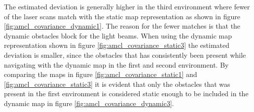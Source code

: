 The estimated deviation is generally higher in the third environment where fewer of the laser scans match with the static map representation as shown in figure \ref{fig:amcl_covariance_dynamic1}. 
The reason for the fewer matches is that the dynamic obstacles block for the light beams. 
When using the dynamic map representation shown in figure \ref{fig:amcl_covariance_static3} the estimated deviation is smaller, since the obstacles that has consistently been present while navigating with the dynamic map in the first and second environment.
By comparing the maps in figure  \ref{fig:amcl_covariance_static1} and \ref{fig:amcl_covariance_static3} it is evident that only the obstacles that was present in the first environment is considered static enough to be included in the dynamic map in figure \ref{fig:amcl_covariance_dynamic3}.


